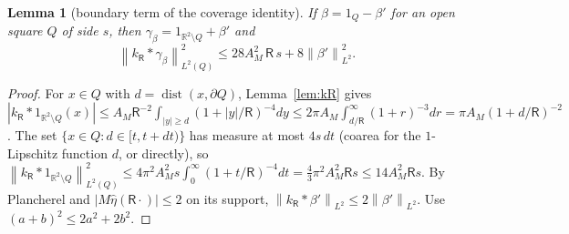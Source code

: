 \documentclass[11pt,reqno]{amsart}
\numberwithin{equation}{section}
\theoremstyle{plain}
\newtheorem{lemma}[theorem]{Lemma}
\theoremstyle{definition}
\newcommand{\R}{\mathbb{R}}
\newcommand{\dist}{\operatorname{dist}}
\newcommand{\norm}[1]{\left\|#1\right\|}
\newcommand{\fR}{\mathsf{R}}
\begin{document}
\begin{lemma}[boundary term of the coverage identity]\label{lem:gammacov}
If $\beta=1_Q-\beta'$ for an open square $Q$ of side $s$, then $\gamma_\beta=1_{\R^2\setminus Q}+\beta'$ and
\[
\norm{k_\fR*\gamma_\beta}_{L^2(Q)}^2\le28A_M^2\,\fR\,s+8\norm{\beta'}_{L^2}^2 .
\]
\end{lemma}
\begin{proof}
For $x\in Q$ with $d=\dist(x,\partial Q)$, Lemma~\ref{lem:kR} gives $|k_\fR*1_{\R^2\setminus Q}(x)|\le A_M\fR^{-2}\int_{|y|\ge d}(1+|y|/\fR)^{-4}dy\le2\pi A_M\int_{d/\fR}^\infty(1+r)^{-3}dr=\pi A_M(1+d/\fR)^{-2}$.  The set $\{x\in Q:d\in[t,t+dt)\}$ has measure at most $4s\,dt$ (coarea for the $1$-Lipschitz function $d$, or directly), so $\norm{k_\fR*1_{\R^2\setminus Q}}_{L^2(Q)}^2\le4\pi^2A_M^2s\int_0^\infty(1+t/\fR)^{-4}dt=\frac43\pi^2A_M^2\fR s\le14A_M^2\fR s$.  By Plancherel and $|M\widehat\eta(\fR\cdot)|\le2$ on its support, $\norm{k_\fR*\beta'}_{L^2}\le2\norm{\beta'}_{L^2}$.  Use $(a+b)^2\le2a^2+2b^2$.
\end{proof}
\end{document}
